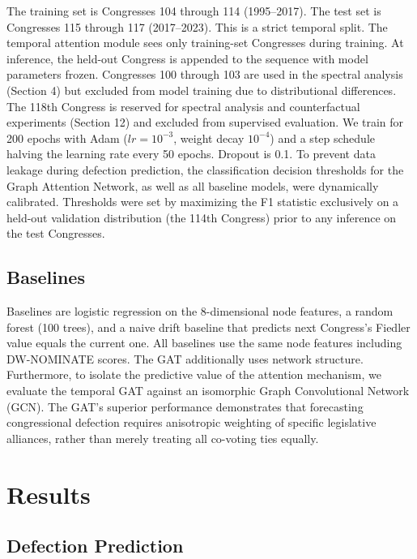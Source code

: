 \documentclass[12pt, a4paper]{article}
\begin{document}
The training set is Congresses 104 through 114 (1995--2017). The test set is Congresses 115 through 117 (2017--2023). This is a strict temporal split. The temporal attention module sees only training-set Congresses during training. At inference, the held-out Congress is appended to the sequence with model parameters frozen. Congresses 100 through 103 are used in the spectral analysis (Section 4) but excluded from model training due to distributional differences. The 118th Congress is reserved for spectral analysis and counterfactual experiments (Section 12) and excluded from supervised evaluation. We train for 200 epochs with Adam ($lr = 10^{-3}$, weight decay $10^{-4}$) and a step schedule halving the learning rate every 50 epochs. Dropout is 0.1. To prevent data leakage during defection prediction, the classification decision thresholds for the Graph Attention Network, as well as all baseline models, were dynamically calibrated. Thresholds were set by maximizing the F1 statistic exclusively on a held-out validation distribution (the 114th Congress) prior to any inference on the test Congresses.

\subsection{Baselines}

Baselines are logistic regression on the 8-dimensional node features, a random forest (100 trees), and a naive drift baseline that predicts next Congress's Fiedler value equals the current one. All baselines use the same node features including DW-NOMINATE scores. The GAT additionally uses network structure. Furthermore, to isolate the predictive value of the attention mechanism, we evaluate the temporal GAT against an isomorphic Graph Convolutional Network (GCN). The GAT's superior performance demonstrates that forecasting congressional defection requires anisotropic weighting of specific legislative alliances, rather than merely treating all co-voting ties equally.

\section{Results}

\subsection{Defection Prediction}
\end{document}
